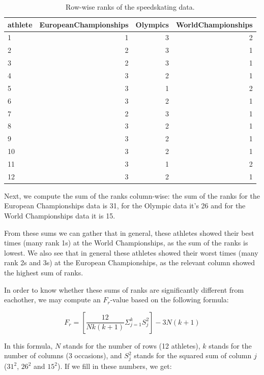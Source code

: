 \documentclass[]{book}\usepackage[]{graphicx}\usepackage[]{color}
\begin{document}
\begin{table}[ht]
\centering
\caption{Row-wise ranks of the speedskating data.} 
\label{tab:nonparmixed_5}
\begin{tabular}{lrrr}
  \hline
athlete & EuropeanChampionships & Olympics & WorldChampionships \\ 
  \hline
1 & 1 & 3 & 2 \\ 
  2 & 2 & 3 & 1 \\ 
  3 & 2 & 3 & 1 \\ 
  4 & 3 & 2 & 1 \\ 
  5 & 3 & 1 & 2 \\ 
  6 & 3 & 2 & 1 \\ 
  7 & 2 & 3 & 1 \\ 
  8 & 3 & 2 & 1 \\ 
  9 & 3 & 2 & 1 \\ 
  10 & 3 & 2 & 1 \\ 
  11 & 3 & 1 & 2 \\ 
  12 & 3 & 2 & 1 \\ 
   \hline
\end{tabular}
\end{table}



Next, we compute the sum of the ranks column-wise: the sum of the ranks for the European Championships data is 31, for the Olympic data it's 26 and for the World Championships data it is 15.

From these sums we can gather that in general, these athletes showed their best times (many rank 1s) at the World Championships, as the sum of the ranks is lowest. We also see that in general these athletes showed their worst times (many rank 2s and 3s) at the European Championships, as the relevant column showed the highest sum of ranks.

In order to know whether these sums of ranks are significantly different from eachother, we may compute an $F_r$-value based on the following formula:


\begin{equation}
F_r = \left[  \frac{12}{Nk(k+1)} \Sigma^k_{j=1} S_j^2      \right] - 3N (k+1)
\end{equation}


In this formula, $N$ stands for the number of rows (12 athletes), $k$ stands for the number of columns (3 occasions), and $S_j^2$ stands for the squared sum of column $j$ ($31^2$, $26^2$ and $15^2$). If we fill in these numbers, we get:
\end{document}
